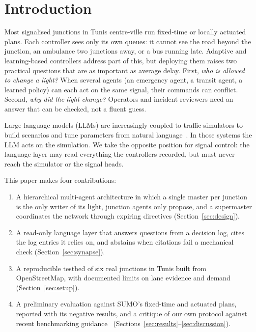 \documentclass[conference]{IEEEtran}
\begin{document}
\section{Introduction}

Most signalised junctions in Tunis centre-ville run fixed-time or locally actuated plans.
Each controller sees only its own queues: it cannot see the road beyond the junction, an
ambulance two junctions away, or a bus running late. Adaptive and learning-based
controllers address part of this, but deploying them raises two practical questions that
are as important as average delay. First, \emph{who is allowed to change a light?} When
several agents (an emergency agent, a transit agent, a learned policy) can each act on the
same signal, their commands can conflict. Second, \emph{why did the light change?} Operators
and incident reviewers need an answer that can be checked, not a fluent guess.

Large language models (LLMs) are increasingly coupled to traffic simulators to build
scenarios and tune parameters from natural language~\cite{li2024chatsumo,jeong2025agentsumo,li2026decoupled}.
In those systems the LLM acts on the simulation. We take the opposite position for signal
control: the language layer may read everything the controllers recorded, but must never
reach the simulator or the signal heads.

This paper makes four contributions:
\begin{enumerate}
\item A hierarchical multi-agent architecture in which a single master per junction is the
only writer of its light, junction agents only propose, and a supermaster coordinates the
network through expiring directives (Section~\ref{sec:design}).
\item A read-only language layer that answers questions from a decision log, cites the log
entries it relies on, and abstains when citations fail a mechanical check
(Section~\ref{sec:synapse}).
\item A reproducible testbed of six real junctions in Tunis built from OpenStreetMap, with
documented limits on lane evidence and demand (Section~\ref{sec:setup}).
\item A preliminary evaluation against SUMO's fixed-time and actuated plans, reported with
its negative results, and a critique of our own protocol against recent benchmarking
guidance~\cite{riehl2026sumoitscontrol} (Sections~\ref{sec:results}--\ref{sec:discussion}).
\end{enumerate}
\end{document}

